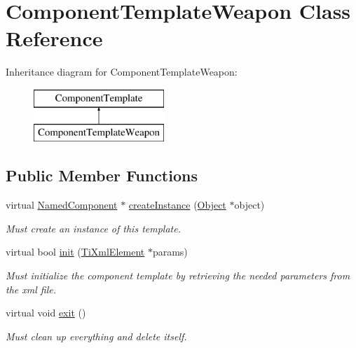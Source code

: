 \hypertarget{classComponentTemplateWeapon}{
\section{\-Component\-Template\-Weapon \-Class \-Reference}
\label{d3/d10/classComponentTemplateWeapon}
}
\-Inheritance diagram for \-Component\-Template\-Weapon\-:\begin{figure}[H]
\begin{center}
\leavevmode
\includegraphics[height=2.000000cm]{d3/d10/classComponentTemplateWeapon}
\end{center}
\end{figure}
\subsection*{\-Public \-Member \-Functions}
\begin{DoxyCompactItemize}
\item 
\hypertarget{classComponentTemplateWeapon_ad0a3dba98d7ff35fb64c28d52022ce74}{
virtual \hyperlink{classNamedComponent}{\-Named\-Component} $\ast$ \hyperlink{classComponentTemplateWeapon_ad0a3dba98d7ff35fb64c28d52022ce74}{create\-Instance} (\hyperlink{classObject}{\-Object} $\ast$object)}
\label{d3/d10/classComponentTemplateWeapon_ad0a3dba98d7ff35fb64c28d52022ce74}

\begin{DoxyCompactList}\small\item\em \-Must create an instance of this template. \end{DoxyCompactList}\item 
\hypertarget{classComponentTemplateWeapon_ae254805ea7338173cb9dd089d511442b}{
virtual bool \hyperlink{classComponentTemplateWeapon_ae254805ea7338173cb9dd089d511442b}{init} (\hyperlink{classTiXmlElement}{\-Ti\-Xml\-Element} $\ast$params)}
\label{d3/d10/classComponentTemplateWeapon_ae254805ea7338173cb9dd089d511442b}

\begin{DoxyCompactList}\small\item\em \-Must initialize the component template by retrieving the needed parameters from the xml file. \end{DoxyCompactList}\item 
\hypertarget{classComponentTemplateWeapon_addc948345623fffede8bb1a1c004f5be}{
virtual void \hyperlink{classComponentTemplateWeapon_addc948345623fffede8bb1a1c004f5be}{exit} ()}
\label{d3/d10/classComponentTemplateWeapon_addc948345623fffede8bb1a1c004f5be}

\begin{DoxyCompactList}\small\item\em \-Must clean up everything and delete itself. \end{DoxyCompactList}\end{DoxyCompactItemize}
